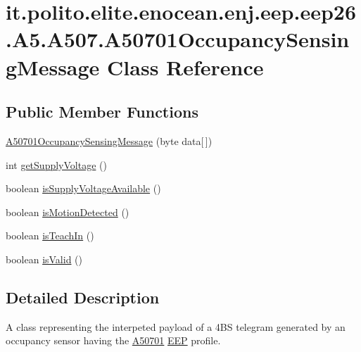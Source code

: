 \hypertarget{classit_1_1polito_1_1elite_1_1enocean_1_1enj_1_1eep_1_1eep26_1_1_a5_1_1_a507_1_1_a50701_occupancy_sensing_message}{}\section{it.\+polito.\+elite.\+enocean.\+enj.\+eep.\+eep26.\+A5.\+A507.\+A50701\+Occupancy\+Sensing\+Message Class Reference}
\label{classit_1_1polito_1_1elite_1_1enocean_1_1enj_1_1eep_1_1eep26_1_1_a5_1_1_a507_1_1_a50701_occupancy_sensing_message}
\subsection*{Public Member Functions}
\begin{DoxyCompactItemize}
\item 
\hyperlink{classit_1_1polito_1_1elite_1_1enocean_1_1enj_1_1eep_1_1eep26_1_1_a5_1_1_a507_1_1_a50701_occupancy_sensing_message_a60c9c3f7b526efe2a17989ffe8dd0161}{A50701\+Occupancy\+Sensing\+Message} (byte data\mbox{[}$\,$\mbox{]})
\item 
int \hyperlink{classit_1_1polito_1_1elite_1_1enocean_1_1enj_1_1eep_1_1eep26_1_1_a5_1_1_a507_1_1_a50701_occupancy_sensing_message_a7258208a80c5403512fc98e9a9c94655}{get\+Supply\+Voltage} ()
\item 
boolean \hyperlink{classit_1_1polito_1_1elite_1_1enocean_1_1enj_1_1eep_1_1eep26_1_1_a5_1_1_a507_1_1_a50701_occupancy_sensing_message_ad4851e208c491665d5e9833ea7aade1d}{is\+Supply\+Voltage\+Available} ()
\item 
boolean \hyperlink{classit_1_1polito_1_1elite_1_1enocean_1_1enj_1_1eep_1_1eep26_1_1_a5_1_1_a507_1_1_a50701_occupancy_sensing_message_a43a46a33962a4beb52efd2a423ca4ae0}{is\+Motion\+Detected} ()
\item 
boolean \hyperlink{classit_1_1polito_1_1elite_1_1enocean_1_1enj_1_1eep_1_1eep26_1_1_a5_1_1_a507_1_1_a50701_occupancy_sensing_message_ad12deab9abc9b3f4b3932d34c3cf6279}{is\+Teach\+In} ()
\item 
boolean \hyperlink{classit_1_1polito_1_1elite_1_1enocean_1_1enj_1_1eep_1_1eep26_1_1_a5_1_1_a507_1_1_a50701_occupancy_sensing_message_a8df9451575aca8096aa615a2c11a9b7c}{is\+Valid} ()
\end{DoxyCompactItemize}


\subsection{Detailed Description}
A class representing the interpeted payload of a 4\+BS telegram generated by an occupancy sensor having the \hyperlink{classit_1_1polito_1_1elite_1_1enocean_1_1enj_1_1eep_1_1eep26_1_1_a5_1_1_a507_1_1_a50701}{A50701} \hyperlink{classit_1_1polito_1_1elite_1_1enocean_1_1enj_1_1eep_1_1_e_e_p}{E\+EP} profile.

